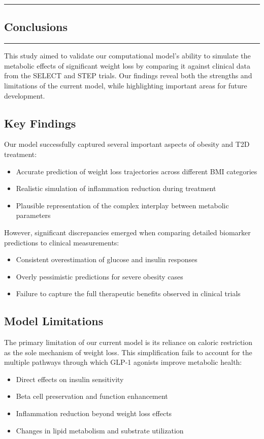 {\color{gray}\hrule}
\begin{center}
\section{Conclusions}
\bigskip
\end{center}
{\color{gray}\hrule}
\vspace{0.5cm}
\begin{multicols}{2}
This study aimed to validate our computational model's ability to simulate the metabolic effects of significant weight loss by comparing it against clinical data from the SELECT and STEP trials. Our findings reveal both the strengths and limitations of the current model, while highlighting important areas for future development.

\subsection{Key Findings}
Our model successfully captured several important aspects of obesity and T2D treatment:
\begin{itemize}
    \item Accurate prediction of weight loss trajectories across different BMI categories
    \item Realistic simulation of inflammation reduction during treatment
    \item Plausible representation of the complex interplay between metabolic parameters
\end{itemize}

However, significant discrepancies emerged when comparing detailed biomarker predictions to clinical measurements:
\begin{itemize}
    \item Consistent overestimation of glucose and insulin responses
    \item Overly pessimistic predictions for severe obesity cases
    \item Failure to capture the full therapeutic benefits observed in clinical trials
\end{itemize}

\subsection{Model Limitations}
The primary limitation of our current model is its reliance on caloric restriction as the sole mechanism of weight loss. This simplification fails to account for the multiple pathways through which GLP-1 agonists improve metabolic health:
\begin{itemize}
    \item Direct effects on insulin sensitivity
    \item Beta cell preservation and function enhancement
    \item Inflammation reduction beyond weight loss effects
    \item Changes in lipid metabolism and substrate utilization
\end{itemize}


\end{multicols}
